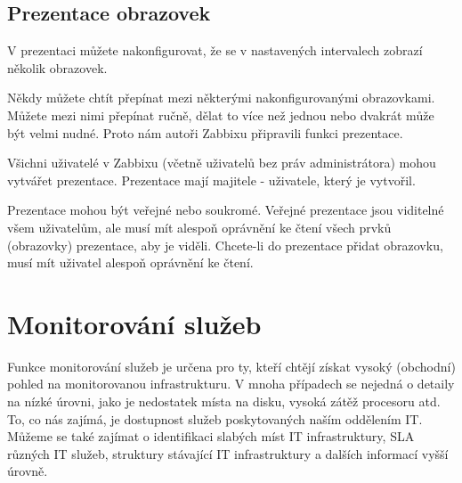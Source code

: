 \documentclass{article}
\begin{document}
\subsection{Prezentace obrazovek}
V prezentaci můžete nakonfigurovat, že se v nastavených intervalech zobrazí několik obrazovek.

Někdy můžete chtít přepínat mezi některými nakonfigurovanými obrazovkami. Můžete mezi nimi přepínat ručně, dělat to více než jednou nebo dvakrát může být velmi nudné. Proto nám autoři Zabbixu připravili funkci prezentace.

Všichni uživatelé v Zabbixu (včetně uživatelů bez práv administrátora) mohou vytvářet prezentace. Prezentace mají majitele - uživatele, který je vytvořil.

Prezentace mohou být veřejné nebo soukromé. Veřejné prezentace jsou viditelné všem uživatelům, ale musí mít alespoň oprávnění ke čtení všech prvků (obrazovky) prezentace, aby je viděli. Chcete-li do prezentace přidat obrazovku, musí mít uživatel alespoň oprávnění ke čtení.
\section{Monitorování služeb}
Funkce monitorování služeb je určena pro ty, kteří chtějí získat vysoký (obchodní) pohled na monitorovanou infrastrukturu. V mnoha případech se nejedná o detaily na nízké úrovni, jako je nedostatek místa na disku, vysoká zátěž procesoru atd. To, co nás zajímá, je dostupnost služeb poskytovaných naším oddělením IT. Můžeme se také zajímat o identifikaci slabých míst IT infrastruktury, SLA různých IT služeb, struktury stávající IT infrastruktury a dalších informací vyšší úrovně.
\end{document}
